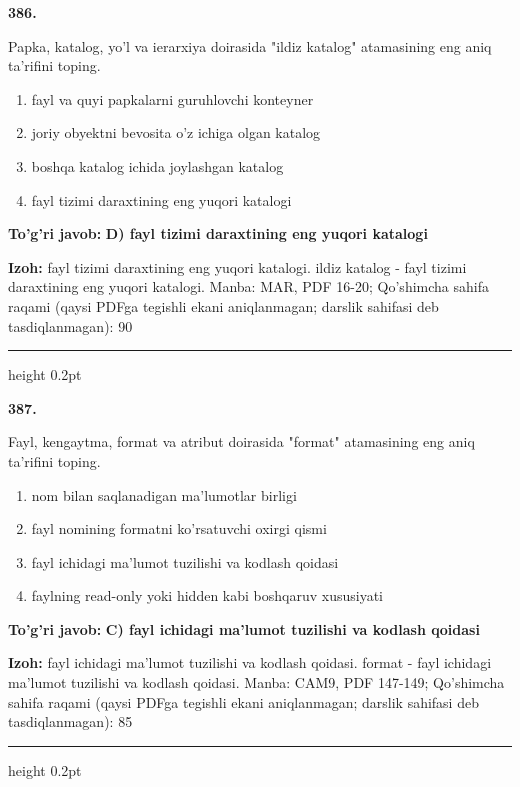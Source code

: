 \documentclass[10pt,a4paper]{article}
\begin{document}
{\bfseries\sffamily\color{ink} 386.}
\par
Papka, katalog, yo'l va ierarxiya doirasida "ildiz katalog" atamasining eng aniq ta'rifini toping.
\begin{enumerate}[label=\Alph*),leftmargin=9mm]
\item fayl va quyi papkalarni guruhlovchi konteyner
\item joriy obyektni bevosita o'z ichiga olgan katalog
\item boshqa katalog ichida joylashgan katalog
\item fayl tizimi daraxtining eng yuqori katalogi
\end{enumerate}
\begin{tcolorbox}[enhanced,breakable,colback=teal!4,colframe=teal!60!black,boxrule=0.45pt,arc=1.2mm,left=2.7mm,right=2.7mm,top=1.8mm,bottom=1.8mm,before skip=2mm,after skip=2mm]
{\bfseries\sffamily\color{teal}To'g'ri javob:} \textbf{D) fayl tizimi daraxtining eng yuqori katalogi}
\par\smallskip
{\bfseries Izoh:} fayl tizimi daraxtining eng yuqori katalogi. ildiz katalog - fayl tizimi daraxtining eng yuqori katalogi. Manba: MAR, PDF 16-20; Qo'shimcha sahifa raqami (qaysi PDFga tegishli ekani aniqlanmagan; darslik sahifasi deb tasdiqlanmagan): 90
\end{tcolorbox}
\vspace{2mm}\hrule height 0.2pt\vspace{3mm}

{\bfseries\sffamily\color{ink} 387.}
\par
Fayl, kengaytma, format va atribut doirasida "format" atamasining eng aniq ta'rifini toping.
\begin{enumerate}[label=\Alph*),leftmargin=9mm]
\item nom bilan saqlanadigan ma'lumotlar birligi
\item fayl nomining formatni ko'rsatuvchi oxirgi qismi
\item fayl ichidagi ma'lumot tuzilishi va kodlash qoidasi
\item faylning read-only yoki hidden kabi boshqaruv xususiyati
\end{enumerate}
\begin{tcolorbox}[enhanced,breakable,colback=teal!4,colframe=teal!60!black,boxrule=0.45pt,arc=1.2mm,left=2.7mm,right=2.7mm,top=1.8mm,bottom=1.8mm,before skip=2mm,after skip=2mm]
{\bfseries\sffamily\color{teal}To'g'ri javob:} \textbf{C) fayl ichidagi ma'lumot tuzilishi va kodlash qoidasi}
\par\smallskip
{\bfseries Izoh:} fayl ichidagi ma'lumot tuzilishi va kodlash qoidasi. format - fayl ichidagi ma'lumot tuzilishi va kodlash qoidasi. Manba: CAM9, PDF 147-149; Qo'shimcha sahifa raqami (qaysi PDFga tegishli ekani aniqlanmagan; darslik sahifasi deb tasdiqlanmagan): 85
\end{tcolorbox}
\vspace{2mm}\hrule height 0.2pt\vspace{3mm}
\end{document}
